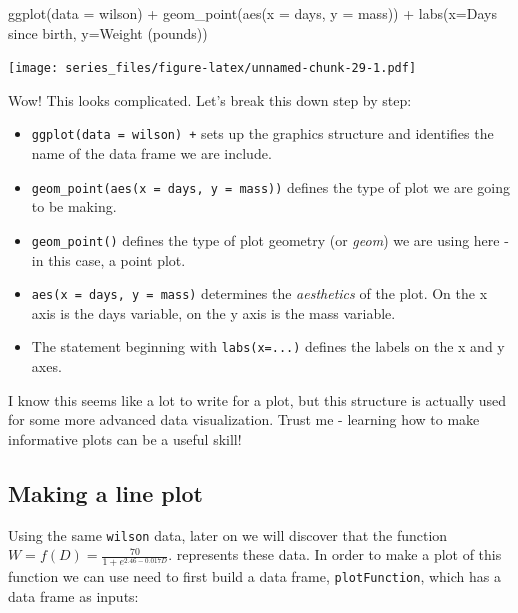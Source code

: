 \documentclass[
]{book}
\newenvironment{Shaded}{\begin{snugshade}}{\end{snugshade}}
\newcommand{\AttributeTok}[1]{\textcolor[rgb]{0.77,0.63,0.00}{#1}}
\newcommand{\FunctionTok}[1]{\textcolor[rgb]{0.00,0.00,0.00}{#1}}
\newcommand{\NormalTok}[1]{#1}
\newcommand{\SpecialCharTok}[1]{\textcolor[rgb]{0.00,0.00,0.00}{#1}}
\newcommand{\StringTok}[1]{\textcolor[rgb]{0.31,0.60,0.02}{#1}}
\providecommand{\tightlist}{%
  \setlength{\itemsep}{0pt}\setlength{\parskip}{0pt}}
\theoremstyle{definition}
\theoremstyle{definition}
\theoremstyle{definition}
\theoremstyle{remark}
\begin{document}
\begin{Shaded}
\begin{Highlighting}[]
\FunctionTok{ggplot}\NormalTok{(}\AttributeTok{data =}\NormalTok{ wilson) }\SpecialCharTok{+} 
  \FunctionTok{geom\_point}\NormalTok{(}\FunctionTok{aes}\NormalTok{(}\AttributeTok{x =}\NormalTok{ days, }\AttributeTok{y =}\NormalTok{ mass)) }\SpecialCharTok{+}
  \FunctionTok{labs}\NormalTok{(}\AttributeTok{x=}\StringTok{\textquotesingle{}Days since birth\textquotesingle{}}\NormalTok{,}
         \AttributeTok{y=}\StringTok{\textquotesingle{}Weight (pounds)\textquotesingle{}}\NormalTok{)}
\end{Highlighting}
\end{Shaded}

\texttt{[image: series\_files/figure-latex/unnamed-chunk-29-1.pdf]}

Wow! This looks complicated. Let's break this down step by step:

\begin{itemize}
\tightlist
\item
  \texttt{ggplot(data\ =\ wilson)\ +} sets up the graphics structure and identifies the name of the data frame we are include.\\
\item
  \texttt{geom\_point(aes(x\ =\ days,\ y\ =\ mass))} defines the type of plot we are going to be making.\\
\item
  \texttt{geom\_point()} defines the type of plot geometry (or \emph{geom}) we are using here - in this case, a point plot.
\item
  \texttt{aes(x\ =\ days,\ y\ =\ mass)} determines the \emph{aesthetics} of the plot. On the x axis is the days variable, on the y axis is the mass variable.
\item
  The statement beginning with \texttt{labs(x=...)} defines the labels on the x and y axes.
\end{itemize}

I know this seems like a lot to write for a plot, but this structure is actually used for some more advanced data visualization. Trust me - learning how to make informative plots can be a useful skill!

\hypertarget{making-a-line-plot}{%
\subsection{Making a line plot}\label{making-a-line-plot}}

Using the same \texttt{wilson} data, later on we will discover that the function \(\displaystyle W =f(D)= \frac{70}{1+e^{2.46-0.017D}}\). represents these data. In order to make a plot of this function we can use need to first build a data frame, \texttt{plotFunction}, which has a data frame as inputs:
\end{document}
